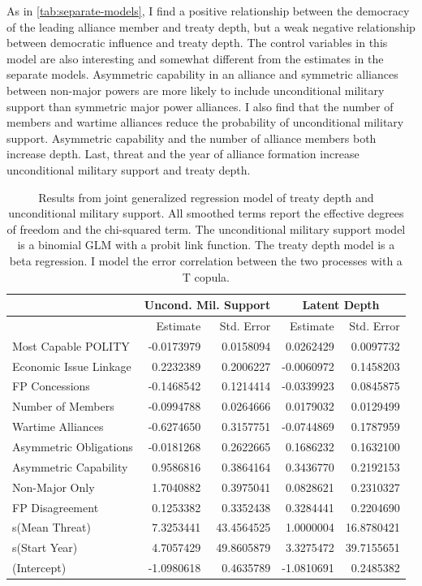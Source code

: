\documentclass[12pt]{article}
\begin{document}
As in \autoref{tab:separate-models}, I find a positive relationship between the democracy of the leading alliance member and treaty depth, but a weak negative relationship between democratic influence and treaty depth.  
The control variables in this model are also interesting and somewhat different from the estimates in the separate models.  
Asymmetric capability in an alliance and symmetric alliances between non-major powers are more likely to include unconditional military support than symmetric major power alliances. 
I also find that the number of members and wartime alliances reduce the probability of unconditional military support. 
Asymmetric capability and the number of alliance members both increase depth. 
Last, threat and the year of alliance formation increase unconditional military support and treaty depth. 


\begin{table}[ht]
\centering
\begin{tabular}{lrrrr}
  & \multicolumn{2}{c}{Uncond. Mil. Support} & \multicolumn{2}{c}{Latent Depth}\\ \hline
  & Estimate & Std. Error & Estimate & Std. Error \\ 
  \hline
  Most Capable POLITY & -0.0173979 & 0.0158094 & 0.0262429 & 0.0097732 \\ 
  Economic Issue Linkage & 0.2232389 & 0.2006227 & -0.0060972 & 0.1458203 \\ 
  FP Concessions & -0.1468542 & 0.1214414 & -0.0339923 & 0.0845875 \\ 
  Number of Members & -0.0994788 & 0.0264666 & 0.0179032 & 0.0129499 \\ 
  Wartime Alliances & -0.6274650 & 0.3157751 & -0.0744869 & 0.1787959 \\ 
  Asymmetric Obligations & -0.0181268 & 0.2622665 & 0.1686232 & 0.1632100 \\ 
  Asymmetric Capability & 0.9586816 & 0.3864164 & 0.3436770 & 0.2192153 \\ 
  Non-Major Only & 1.7040882 & 0.3975041 & 0.0828621 & 0.2310327 \\ 
  FP Disagreement & 0.1253382 & 0.3352438 & 0.3284441 & 0.2204690 \\ 
  s(Mean Threat) & 7.3253441 & 43.4564525 & 1.0000004 & 16.8780421 \\ 
  s(Start Year) & 4.7057429 & 49.8605879 & 3.3275472 & 39.7155651 \\
  (Intercept) & -1.0980618 & 0.4635789 & -1.0810691 & 0.2485382 \\  
   \hline
\end{tabular}
\caption{Results from joint generalized regression model of treaty depth and unconditional military support. 
                     All smoothed terms report the effective degrees of freedom and the chi-squared term. 
                     The unconditional military support model is a binomial GLM with a probit link function. 
                     The treaty depth model is a beta regression. 
                     I model the error correlation between the two processes with a T copula.} 
\label{tab:gjrm-res}
\end{table} 
\end{document}
